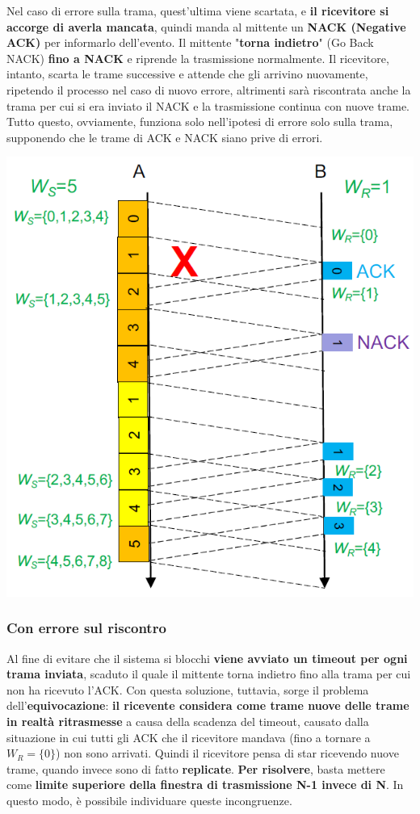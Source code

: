 \documentclass[12pt]{article}
\begin{document}
Nel caso di errore sulla trama, quest'ultima viene scartata, e \textbf{il ricevitore si accorge di averla mancata}, quindi manda al mittente un \textbf{NACK (Negative ACK)} per informarlo dell'evento. Il mittente "\textbf{torna indietro}" (Go Back NACK) \textbf{fino a NACK} e riprende la trasmissione normalmente. Il ricevitore, intanto, scarta le trame successive e attende che gli arrivino nuovamente, ripetendo il processo nel caso di nuovo errore, altrimenti
sarà riscontrata anche la trama per cui si era inviato il NACK e la trasmissione continua con nuove trame. Tutto questo, ovviamente, funziona solo nell'ipotesi di errore solo sulla trama, supponendo che le trame di ACK e NACK siano prive di errori.

\begin{center}
    \includegraphics[scale=0.3]{go_back_n_frame_error}
\end{center}

\subsubsection{Con errore sul riscontro}

Al fine di evitare che il sistema si blocchi \textbf{viene avviato un timeout per ogni trama inviata}, scaduto il quale il mittente torna indietro fino alla trama per cui non ha ricevuto l'ACK. Con questa soluzione, tuttavia, sorge il problema dell'\textbf{equivocazione}: \textbf{il ricevente considera come trame nuove delle trame in realtà ritrasmesse} a causa della scadenza del timeout, causato dalla situazione in cui tutti gli ACK che il ricevitore mandava (fino a tornare a $W_R=\{0\}$) non sono arrivati. Quindi il ricevitore pensa di star ricevendo nuove trame, quando invece sono di fatto \textbf{replicate}. \textbf{Per risolvere}, basta mettere come \textbf{limite superiore della finestra di trasmissione N-1 invece di N}. In questo modo, è possibile individuare queste incongruenze.
\end{document}
